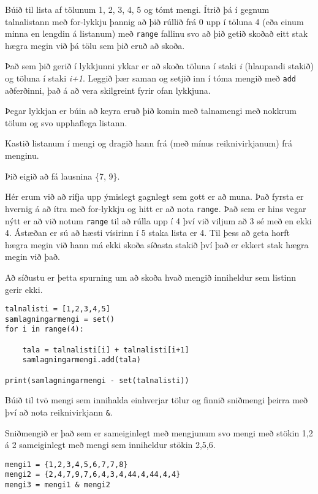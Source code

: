 \begin{exercise}\label{set3}
Búið til lista af tölunum 1, 2, 3, 4, 5 og tómt mengi.
Ítrið þá í gegnum talnalistann með for-lykkju þannig að þið rúllið frá 0 upp í töluna 4 (eða einum minna en lengdin á listanum) með \texttt{range} fallinu svo að þið getið skoðað eitt stak hægra megin við þá tölu sem þið eruð að skoða.

Það sem þið gerið í lykkjunni ykkar er að skoða töluna í staki \textit{i} (hlaupandi stakið) og töluna í staki \textit{i+1}.
Leggið þær saman og setjið inn í tóma mengið með \texttt{add} aðferðinni, það á að vera skilgreint fyrir ofan lykkjuna.

Þegar lykkjan er búin að keyra eruð þið komin með talnamengi með nokkrum tölum og svo upphaflega listann.

Kastið listanum í mengi og dragið hann frá (með mínus reiknivirkjanum) frá menginu.

Þið eigið að fá lausnina \{7, 9\}.
\end{exercise}
\begin{Answer}[ref={set3}]
Hér erum við að rifja upp ýmislegt gagnlegt sem gott er að muna.
Það fyrsta er hvernig á að ítra með for-lykkju og hitt er að nota \texttt{range}.
Það sem er hins vegar nýtt er að við notum \texttt{range} til að rúlla upp í 4 því við viljum að 3 sé með en ekki 4.
Ástæðan er sú að hæsti vísirinn í 5 staka lista er 4.
Til þess að geta horft hægra megin við hann má ekki skoða síðasta stakið því það er ekkert stak hægra megin við það.

Að síðustu er þetta spurning um að skoða hvað mengið inniheldur sem listinn gerir ekki.

	\begin{lstlisting}
talnalisti = [1,2,3,4,5]
samlagningarmengi = set()
for i in range(4):

	tala = talnalisti[i] + talnalisti[i+1]
	samlagningarmengi.add(tala)

print(samlagningarmengi - set(talnalisti))\end{lstlisting}
\end{Answer}

\begin{exercise}\label{set4}
Búið til tvö mengi sem innihalda einhverjar tölur og finnið sniðmengi þeirra með því að nota reiknivirkjann \texttt{\&}.
\end{exercise}
\begin{Answer}[ref={set4}]
	Sniðmengið er það sem er sameiginlegt með mengjunum svo mengi með stökin 1,2 á 2 sameiginlegt með mengi sem inniheldur stökin 2,5,6.
\begin{lstlisting}
mengi1 = {1,2,3,4,5,6,7,7,8}
mengi2 = {2,4,7,9,7,6,4,3,4,44,4,44,4,4}
mengi3 = mengi1 & mengi2\end{lstlisting}
\newpage
\end{Answer}